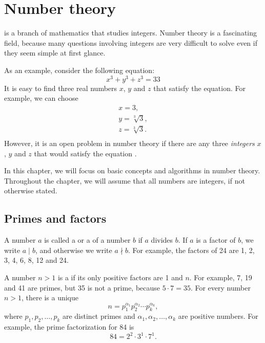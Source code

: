 \chapter{Number theory}


 is a branch of mathematics
that studies integers.
Number theory is a fascinating field,
because many questions involving integers
are very difficult to solve even if they
seem simple at first glance.

As an example, consider the following equation:
\[x^3 + y^3 + z^3 = 33\]
It is easy to find three real numbers $x$, $y$ and $z$
that satisfy the equation.
For example, we can choose
\[
\begin{array}{lcl}
x = 3, \\
y = \sqrt[3]{3}, \\
z = \sqrt[3]{3}.\\
\end{array}
\]
However, it is an open problem in number theory
if there are any three
\emph{integers} $x$, $y$ and $z$
that would satisfy the equation \cite{bec07}.

In this chapter, we will focus on basic concepts
and algorithms in number theory.
Throughout the chapter, we will assume that all numbers
are integers, if not otherwise stated.

\section{Primes and factors}


A number $a$ is called a  or a  of a number $b$
if $a$ divides $b$.
If $a$ is a factor of $b$,
we write $a \mid b$, and otherwise we write $a \nmid b$.
For example, the factors of 24 are
1, 2, 3, 4, 6, 8, 12 and 24.


A number $n>1$ is a 
if its only positive factors are 1 and $n$.
For example, 7, 19 and 41 are primes,
but 35 is not a prime, because $5 \cdot 7 = 35$.
For every number $n>1$, there is a unique
\[ n = p_1^{\alpha_1} p_2^{\alpha_2} \cdots p_k^{\alpha_k},\]
where $p_1,p_2,\ldots,p_k$ are distinct primes and
$\alpha_1,\alpha_2,\ldots,\alpha_k$ are positive numbers.
For example, the prime factorization for 84 is
\[84 = 2^2 \cdot 3^1 \cdot 7^1.\]

